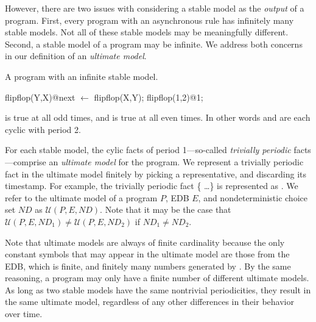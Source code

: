 However, there are two issues with considering a stable model as the {\em output} of a \lang program.  First, every program with an asynchronous rule has infinitely many stable models.  Not all of these stable models may be meaningfully different.  Second, a stable model of a \lang program may be infinite.  We address both concerns in our definition of an {\em ultimate model}.

\begin{example}
\label{ex:flipflop}
A \lang program with an infinite stable model.

\begin{Dedalus}
flipflop(Y,X)@next \(\leftarrow\) flipflop(X,Y);
flipflop(1,2)@1;
\end{Dedalus}

 is true at all odd times, and  is true at all even times.  In other words  and  are each cyclic with period 2.
\end{example}



\begin{definition}
For each stable model, the cylic facts of period 1---so-called {\em trivially periodic} facts---comprise an {\em ultimate model} for the program.  We represent a trivially periodic fact in the ultimate model finitely by picking a representative, and discarding its timestamp.
For example, the trivially periodic fact \{ \ldots\} is represented as .  We refer to the ultimate model of a program $P$, EDB $E$, and nondeterministic choice set $ND$ as $\mathcal{U}(P, E, ND)$.  Note that it may be the case that $\mathcal{U}(P, E, ND_1) \neq \mathcal{U}(P, E, ND_2)$ if $ND_1 \neq ND_2$.
\end{definition}

Note that ultimate models are always of finite cardinality because the only constant symbols that may appear in the ultimate model are those from the EDB, which is finite, and finitely many numbers generated by .  By the same reasoning, a \lang program may only have a finite number of different ultimate models.  As long as two stable models have the same nontrivial periodicities, they result in the same ultimate model, regardless of any other differences in their behavior over time. 

